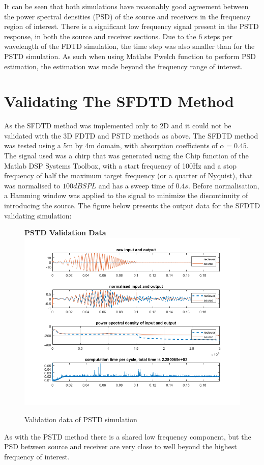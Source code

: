 It can be seen that both simulations have reasonably good agreement between the power spectral densities (PSD) of the source and receivers in the frequency region of interest. There is a significant low frequency signal present in the PSTD response, in both the source and receiver sections.  Due to the 6 steps per wavelength of the FDTD simulation, the time step was also smaller than for the PSTD simulation. As such when using Matlabs Pwelch function to perform PSD estimation, the estimation was made beyond the frequency range of interest.\\


\section{Validating The SFDTD Method}
As the SFDTD method was implemented only to 2D and it could not be validated with the 3D FDTD and PSTD methods as above. The SFDTD method was tested using a 5m by 4m domain, with absorption coefficients of $ \alpha = 0.45$. The signal used was a chirp that was generated using the Chip function of the Matlab DSP Systems Toolbox, with a start frequency of 100Hz and a stop frequency of half the maximum target frequency (or a quarter of Nyquist), that was normalised to $100dBSPL$ and has a sweep time of $0.4s$. Before normalisation, a Hamming window was applied to the signal to minimize the discontinuity of introducing the source. The figure below presents the output data for the SFDTD validating simulation:\\

\begin{figure}[H]
\centering
\textbf{PSTD Validation Data}
  \includegraphics[width=\textwidth]{./graphics/SFDTDvalidationFinal.png}
  \caption{Validation data of PSTD simulation}
\end{figure}
As with the PSTD method there is a shared low frequency component, but the PSD between source and receiver are very close to well beyond the highest frequency of interest.